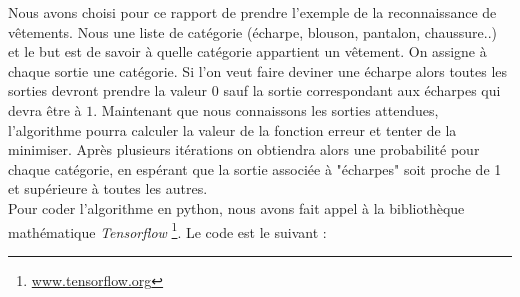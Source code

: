 	Nous avons choisi pour ce rapport de prendre l'exemple de la reconnaissance de vêtements. Nous une liste de catégorie (écharpe, blouson, pantalon, chaussure..) et le but est de savoir à quelle catégorie appartient un vêtement. On assigne à chaque sortie une catégorie. Si l'on veut faire deviner une écharpe alors toutes les sorties devront prendre la valeur $0$ sauf la sortie correspondant aux écharpes qui devra être à $1$. Maintenant que nous connaissons les sorties attendues, l'algorithme pourra calculer la valeur de la fonction erreur et tenter de la minimiser. Après plusieurs itérations on obtiendra alors une probabilité pour chaque catégorie, en espérant que la sortie associée à "écharpes" soit proche de 1 et supérieure à toutes les autres.\\
	
	Pour coder l'algorithme en python, nous avons fait appel à la bibliothèque mathématique \textit{Tensorflow} \footnote{\url{www.tensorflow.org}}. Le code est le suivant :
